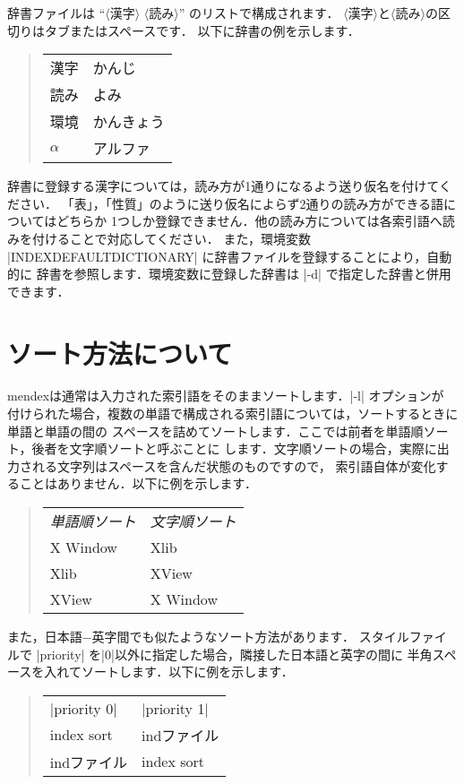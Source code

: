 \documentclass[a4paper]{jsarticle}
\newcommand{\SoftName}[1]{\textsf{#1}}
\newcommand{\jMeta}[1]{$\langle$\mbox{}\textsf{#1}\mbox{}$\rangle$}
\begin{document}
辞書ファイルは ``\jMeta{漢字} \jMeta{読み}'' のリストで構成されます．
\jMeta{漢字}と\jMeta{読み}の区切りはタブまたはスペースです．
以下に辞書の例を示します．
%
\begin{quote}
\begin{tabular}{ll}
漢字 & かんじ \\
読み & よみ \\
環境 & かんきょう \\
$\alpha$ & アルファ
\end{tabular}
\end{quote}

辞書に登録する漢字については，読み方が1通りになるよう送り仮名を付けてください．
「表」，「性質」のように送り仮名によらず2通りの読み方ができる語についてはどちらか
1つしか登録できません．他の読み方については各索引語へ読みを付けることで対応してください．
また，環境変数 |INDEXDEFAULTDICTIONARY| に辞書ファイルを登録することにより，自動的に
辞書を参照します．環境変数に登録した辞書は |-d| で指定した辞書と併用できます．

\section{ソート方法について}

\SoftName{mendex}は通常は入力された索引語をそのままソートします．|-l| オプションが
付けられた場合，複数の単語で構成される索引語については，ソートするときに単語と単語の間の
スペースを詰めてソートします．ここでは前者を単語順ソート，後者を文字順ソートと呼ぶことに
します．文字順ソートの場合，実際に出力される文字列はスペースを含んだ状態のものですので，
索引語自体が変化することはありません．以下に例を示します．
%
\begin{quote}
\begin{tabular}{ll}
\emph{単語順ソート} & \emph{文字順ソート} \\
X Window & Xlib \\
Xlib & XView \\
XView & X Window
\end{tabular}
\end{quote}

また，日本語−英字間でも似たようなソート方法があります．
スタイルファイルで |priority| を|0|以外に指定した場合，隣接した日本語と英字の間に
半角スペースを入れてソートします．以下に例を示します．
%
\begin{quote}
\begin{tabular}{ll}
|priority 0| & |priority 1| \\
index sort & indファイル \\
indファイル & index sort
\end{tabular}
\end{quote}
\end{document}
